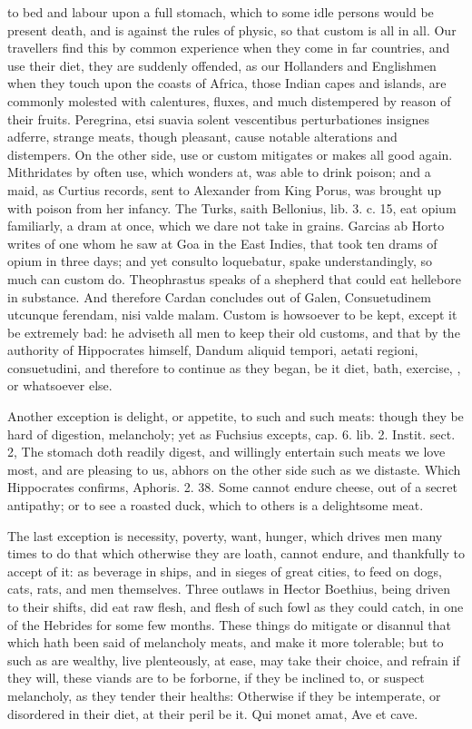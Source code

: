 {{to bed and labour upon a full stomach, which to some idle persons would
be present death, and is against the rules of physic, so that custom is
all in all. Our travellers find this by common experience when they
come in far countries, and use their diet, they are suddenly offended,
as our Hollanders and Englishmen when they touch upon the coasts
of Africa, those Indian capes and islands, are commonly molested with
calentures, fluxes, and much distempered by reason of their fruits.
Peregrina, etsi suavia solent vescentibus perturbationes insignes
adferre, strange meats, though pleasant, cause notable alterations and
distempers. On the other side, use or custom mitigates or makes all
good again. Mithridates by often use, which \Pliny{} wonders at, was able
to drink poison; and a maid, as Curtius records, sent to Alexander from
King Porus, was brought up with poison from her infancy. The Turks,
saith Bellonius, lib. 3. c. 15, eat opium familiarly, a dram at once,
which we dare not take in grains. Garcias ab Horto writes of one
whom he saw at Goa in the East Indies, that took ten drams of opium in
three days; and yet consulto loquebatur, spake understandingly, so much
can custom do.  Theophrastus speaks of a shepherd that could eat
hellebore in substance. And therefore Cardan concludes out of Galen,
Consuetudinem utcunque ferendam, nisi valde malam. Custom is howsoever
to be kept, except it be extremely bad: he adviseth all men to keep
their old customs, and that by the authority of Hippocrates
himself, Dandum aliquid tempori, aetati regioni, consuetudini, and
therefore to continue as they began, be it diet, bath, exercise,
\etc{}, or whatsoever else.

Another exception is delight, or appetite, to such and such meats:
though they be hard of digestion, melancholy; yet as Fuchsius excepts,
cap. 6. lib. 2. Instit. sect. 2, The stomach doth readily digest,
and willingly entertain such meats we love most, and are pleasing to
us, abhors on the other side such as we distaste. Which Hippocrates
confirms, Aphoris. 2. 38. Some cannot endure cheese, out of a secret
antipathy; or to see a roasted duck, which to others is a
delightsome meat.

The last exception is necessity, poverty, want, hunger, which drives
men many times to do that which otherwise they are loath, cannot
endure, and thankfully to accept of it: as beverage in ships, and in
sieges of great cities, to feed on dogs, cats, rats, and men
themselves. Three outlaws in Hector Boethius, being driven to
their shifts, did eat raw flesh, and flesh of such fowl as they could
catch, in one of the Hebrides for some few months. These things do
mitigate or disannul that which hath been said of melancholy meats, and
make it more tolerable; but to such as are wealthy, live plenteously,
at ease, may take their choice, and refrain if they will, these viands
are to be forborne, if they be inclined to, or suspect melancholy, as
they tender their healths: Otherwise if they be intemperate, or
disordered in their diet, at their peril be it. Qui monet amat, Ave et
cave.

}}
